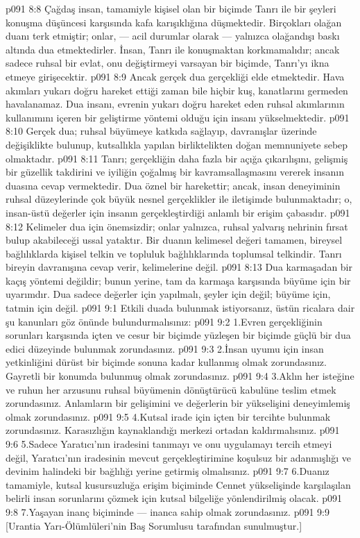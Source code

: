 \vs p091 8:8 Çağdaş insan, tamamiyle kişisel olan bir biçimde Tanrı ile bir şeyleri konuşma düşüncesi karşısında kafa karışıklığına düşmektedir. Birçokları olağan duanı terk etmiştir; onlar, --- acil durumlar olarak --- yalnızca olağandışı baskı altında dua etmektedirler. İnsan, Tanrı ile konuşmaktan korkmamalıdır; ancak sadece ruhsal bir evlat, onu değiştirmeyi varsayan bir biçimde, Tanrı’yı ikna etmeye girişecektir.
\vs p091 8:9 Ancak gerçek dua gerçekliği elde etmektedir. Hava akımları yukarı doğru hareket ettiği zaman bile hiçbir kuş, kanatlarını germeden havalanamaz. Dua insanı, evrenin yukarı doğru hareket eden ruhsal akımlarının kullanımını içeren bir geliştirme yöntemi olduğu için insanı yükselmektedir.
\vs p091 8:10 Gerçek dua; ruhsal büyümeye katkıda sağlayıp, davranışlar üzerinde değişiklikte bulunup, kutsallıkla yapılan birliktelikten doğan memnuniyete sebep olmaktadır.
\vs p091 8:11 Tanrı; gerçekliğin daha fazla bir açığa çıkarılışını, gelişmiş bir güzellik takdirini ve iyiliğin çoğalmış bir kavramsallaşmasını vererek insanın duasına cevap vermektedir. Dua öznel bir harekettir; ancak, insan deneyiminin ruhsal düzeylerinde çok büyük nesnel gerçeklikler ile iletişimde bulunmaktadır; o, insan\hyp{}üstü değerler için insanın gerçekleştirdiği anlamlı bir erişim çabasıdır.
\vs p091 8:12 Kelimeler dua için önemsizdir; onlar yalnızca, ruhsal yalvarış nehrinin fırsat bulup akabileceği ussal yataktır. Bir duanın kelimesel değeri tamamen, bireysel bağlılıklarda kişisel telkin ve topluluk bağlılıklarında toplumsal telkindir. Tanrı bireyin davranışına cevap verir, kelimelerine değil.
\vs p091 8:13 Dua karmaşadan bir kaçış yöntemi değildir; bunun yerine, tam da karmaşa karşısında büyüme için bir uyarımdır. Dua sadece değerler için yapılmalı, şeyler için değil; büyüme için, tatmin için değil.
\vs p091 9:1 Etkili duada bulunmak istiyorsanız, üstün ricalara dair şu kanunları göz önünde bulundurmalısınız:
\vs p091 9:2 1.\bibnobreakspace Evren gerçekliğinin sorunları karşısında içten ve cesur bir biçimde yüzleşen bir biçimde güçlü bir dua edici düzeyinde bulunmak zorundasınız.
\vs p091 9:3 2.\bibnobreakspace İnsan uyumu için insan yetkinliğini dürüst bir biçimde sonuna kadar kullanmış olmak zorundasınız. Gayretli bir konumda bulunmuş olmak zorundasınız.
\vs p091 9:4 3.\bibnobreakspace Aklın her isteğine ve ruhun her arzusunu ruhsal büyümenin dönüştürücü kabulüne teslim etmek zorundasınız. Anlamların bir gelişimini ve değerlerin bir yükselişini deneyimlemiş olmak zorundasınız.
\vs p091 9:5 4.\bibnobreakspace Kutsal irade için içten bir tercihte bulunmak zorundasınız. Karasızlığın kaynaklandığı merkezi ortadan kaldırmalısınız.
\vs p091 9:6 5.\bibnobreakspace Sadece Yaratıcı’nın iradesini tanımayı ve onu uygulamayı tercih etmeyi değil, Yaratıcı’nın iradesinin mevcut gerçekleştirimine koşulsuz bir adanmışlığı ve devinim halindeki bir bağlılığı yerine getirmiş olmalısınız.
\vs p091 9:7 6.\bibnobreakspace Duanız tamamiyle, kutsal kusursuzluğa erişim biçiminde Cennet yükselişinde karşılaşılan belirli insan sorunlarını çözmek için kutsal bilgeliğe yönlendirilmiş olacak.
\vs p091 9:8 7.\bibnobreakspace Yaşayan inanç biçiminde --- inanca sahip olmak zorundasınız.
\vs p091 9:9 [Urantia Yarı\hyp{}Ölümlüleri’nin Baş Sorumlusu tarafından sunulmuştur.]
